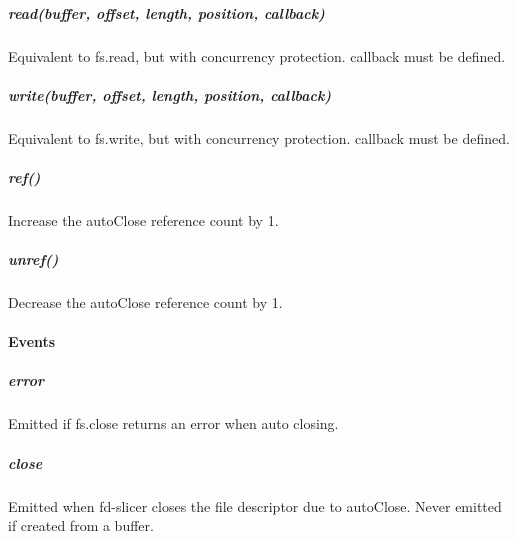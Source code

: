 \subparagraph*{read(buffer, offset, length, position, callback)}

Equivalent to {\ttfamily fs.\+read}, but with concurrency protection. {\ttfamily callback} must be defined.

\subparagraph*{write(buffer, offset, length, position, callback)}

Equivalent to {\ttfamily fs.\+write}, but with concurrency protection. {\ttfamily callback} must be defined.

\subparagraph*{ref()}

Increase the {\ttfamily auto\+Close} reference count by 1.

\subparagraph*{unref()}

Decrease the {\ttfamily auto\+Close} reference count by 1.

\paragraph*{Events}

\subparagraph*{\textquotesingle{}error\textquotesingle{}}

Emitted if {\ttfamily fs.\+close} returns an error when auto closing.

\subparagraph*{\textquotesingle{}close\textquotesingle{}}

Emitted when fd-\/slicer closes the file descriptor due to {\ttfamily auto\+Close}. Never emitted if created from a buffer. 